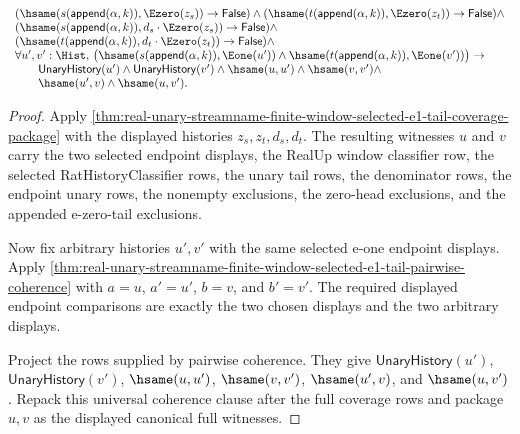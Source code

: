 \begin{theorem}
$$\begin{array}{l}
(\hsame(s(\mathsf{append}(\alpha,k)),\Ezero(z_s))\to\mathsf{False})\land
(\hsame(t(\mathsf{append}(\alpha,k)),\Ezero(z_t))\to\mathsf{False})\land\\
(\hsame(s(\mathsf{append}(\alpha,k)),d_s\cdot\Ezero(z_s))\to
\mathsf{False})\land\\
(\hsame(t(\mathsf{append}(\alpha,k)),d_t\cdot\Ezero(z_t))\to
\mathsf{False})\land\\
\forall u',v':\Hist,\,
\bigl(\hsame(s(\mathsf{append}(\alpha,k)),\Eone(u'))\land
\hsame(t(\mathsf{append}(\alpha,k)),\Eone(v'))\bigr)\to\\
\qquad
\mathsf{UnaryHistory}(u')\land
\mathsf{UnaryHistory}(v')\land
\hsame(u,u')\land
\hsame(v,v')\land\\
\qquad
\hsame(u',v)\land
\hsame(u,v').
\end{array}
$$
\end{theorem}
\begin{proof}
Apply
\autoref{thm:real-unary-streamname-finite-window-selected-e1-tail-coverage-package}
with the displayed histories $z_s,z_t,d_s,d_t$. The resulting witnesses $u$ and
$v$ carry the two selected endpoint displays, the RealUp window classifier row,
the selected RatHistoryClassifier rows, the unary tail rows, the denominator
rows, the endpoint unary rows, the nonempty exclusions, the zero-head
exclusions, and the appended e-zero-tail exclusions.

Now fix arbitrary histories $u',v'$ with the same selected e-one endpoint
displays. Apply
\autoref{thm:real-unary-streamname-finite-window-selected-e1-tail-pairwise-coherence}
with $a=u$, $a'=u'$, $b=v$, and $b'=v'$. The required displayed endpoint
comparisons are exactly the two chosen displays and the two arbitrary displays.

Project the rows supplied by pairwise coherence. They give
$\mathsf{UnaryHistory}(u')$, $\mathsf{UnaryHistory}(v')$, $\hsame(u,u')$,
$\hsame(v,v')$, $\hsame(u',v)$, and $\hsame(u,v')$. Repack this universal
coherence clause after the full coverage rows and package $u,v$ as the displayed
canonical full witnesses.
\end{proof}

